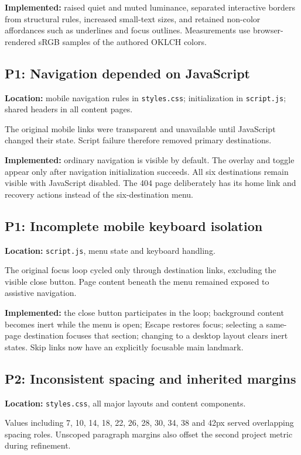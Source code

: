 \documentclass[11pt,a4paper]{article}
\newcommand{\file}[1]{\nolinkurl{#1}}
\begin{document}
\textbf{Implemented:} raised quiet and muted luminance, separated interactive borders from structural rules, increased small-text sizes, and retained non-color affordances such as underlines and focus outlines. Measurements use browser-rendered sRGB samples of the authored OKLCH colors.

\subsection{P1: Navigation depended on JavaScript}
\textbf{Location:} mobile navigation rules in \file{styles.css}; initialization in \file{script.js}; shared headers in all content pages.

The original mobile links were transparent and unavailable until JavaScript changed their state. Script failure therefore removed primary destinations.

\textbf{Implemented:} ordinary navigation is visible by default. The overlay and toggle appear only after navigation initialization succeeds. All six destinations remain visible with JavaScript disabled. The 404 page deliberately has its home link and recovery actions instead of the six-destination menu.

\subsection{P1: Incomplete mobile keyboard isolation}
\textbf{Location:} \file{script.js}, menu state and keyboard handling.

The original focus loop cycled only through destination links, excluding the visible close button. Page content beneath the menu remained exposed to assistive navigation.

\textbf{Implemented:} the close button participates in the loop; background content becomes inert while the menu is open; Escape restores focus; selecting a same-page destination focuses that section; changing to a desktop layout clears inert states. Skip links now have an explicitly focusable main landmark.

\subsection{P2: Inconsistent spacing and inherited margins}
\textbf{Location:} \file{styles.css}, all major layouts and content components.

Values including 7, 10, 14, 18, 22, 26, 28, 30, 34, 38 and 42px served overlapping spacing roles. Unscoped paragraph margins also offset the second project metric during refinement.
\end{document}
